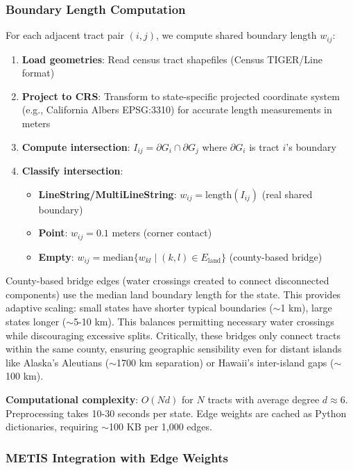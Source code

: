 \subsubsection{Boundary Length Computation}\label{sec:edge-weights}

For each adjacent tract pair $(i,j)$, we compute shared boundary length $w_{ij}$:

\begin{enumerate}
\item \textbf{Load geometries}: Read census tract shapefiles (Census TIGER/Line format)
\item \textbf{Project to CRS}: Transform to state-specific projected coordinate system (e.g., California Albers EPSG:3310) for accurate length measurements in meters
\item \textbf{Compute intersection}: $I_{ij} = \partial G_i \cap \partial G_j$ where $\partial G_i$ is tract $i$'s boundary
\item \textbf{Classify intersection}:
\begin{itemize}
    \item \textbf{LineString/MultiLineString}: $w_{ij} = \text{length}(I_{ij})$ (real shared boundary)
    \item \textbf{Point}: $w_{ij} = 0.1$ meters (corner contact)
    \item \textbf{Empty}: $w_{ij} = \text{median}\{w_{kl} \mid (k,l) \in E_{\text{land}}\}$ (county-based bridge)
\end{itemize}
\end{enumerate}

County-based bridge edges (water crossings created to connect disconnected components) use the median land boundary length for the state. This provides adaptive scaling: small states have shorter typical boundaries ($\sim$1 km), large states longer ($\sim$5-10 km). This balances permitting necessary water crossings while discouraging excessive splits. Critically, these bridges only connect tracts within the same county, ensuring geographic sensibility even for distant islands like Alaska's Aleutians ($\sim$1700 km separation) or Hawaii's inter-island gaps ($\sim$100 km).

\textbf{Computational complexity}: $O(Nd)$ for $N$ tracts with average degree $d \approx 6$. Preprocessing takes 10-30 seconds per state. Edge weights are cached as Python dictionaries, requiring $\sim$100 KB per 1,000 edges.

\subsubsection{METIS Integration with Edge Weights}

